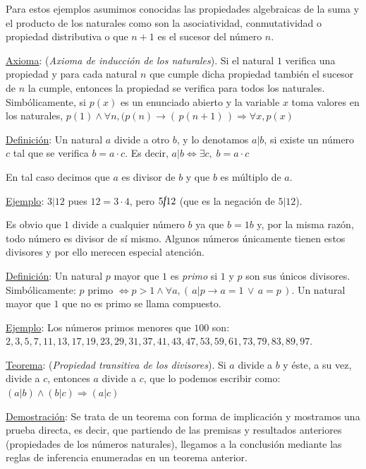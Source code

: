 Para estos ejemplos asumimos conocidas las propiedades algebraicas de la suma y el producto de los naturales como son la asociatividad, conmutatividad o propiedad distributiva o que $n + 1$ es el sucesor del número $n$.

\underline{Axioma}: (\emph{Axioma de inducción de los naturales}). Si el natural $1$ verifica una propiedad y para cada natural $n$ que cumple dicha propiedad también el sucesor de $n$ la cumple, entonces la propiedad se verifica para todos los naturales. Simbólicamente, si $p(x)$ es un enunciado abierto y la variable $x$ toma valores en los naturales, $p(1) \wedge \forall n , (p(n) \to  (\,p(n + 1)\,) \Rightarrow \forall x, p(x)$

\underline{Definición}: Un natural $a$ divide a otro $b$, y lo denotamos $a|b$, si existe un número $c$ tal que se verifica $b = a \cdot c$. Es decir, $a|b \Leftrightarrow \exists c,\;  b = a \cdot c$

En tal caso decimos que $a$ es divisor de $b$ y que $b$ es múltiplo de $a$.

\underline{Ejemplo}: $3|12$ pues $12 = 3 \cdot 4$, pero $5 \cancel{|} 12$ (que es la negación de $5|12$).

Es obvio que $1$ divide a cualquier número $b$ ya que $b = 1b$ y, por la misma razón, todo número es divisor de sí mismo. Algunos números únicamente tienen estos divisores y por ello merecen especial atención.

\underline{Definición}: Un natural $p$ mayor que $1$ es \emph{primo} si $1$ y $p$ son sus únicos divisores. Simbólicamente: $p \text{ primo } \Leftrightarrow p>1 \wedge \forall a, (\, a|p \to a=1\,  \vee \, a=p \,)$. Un natural mayor que $1$ que no es primo se llama compuesto.

\underline{Ejemplo}: Los números primos menores que $100$ son: $2, 3, 5, 7, 11, 13, 17, 19, 23, 29, 31, 37, 41, 43, 47, 53, 59, 61, 73, 79, 83, 89, 97$.

\underline{Teorema}: (\emph{Propiedad transitiva de los divisores}). Si $a$ divide a $b$ y éste, a su vez, divide a $c$, entonces $a$ divide a $c$, que lo podemos escribir como: $(a|b) \wedge (b|c) \Rightarrow  (a|c)$

\underline{Demostración}: Se trata de un teorema con forma de implicación y mostramos una prueba directa, es decir, que partiendo de las premisas y resultados anteriores (propiedades de los números naturales), llegamos a la conclusión mediante las reglas de inferencia enumeradas en un teorema anterior.

